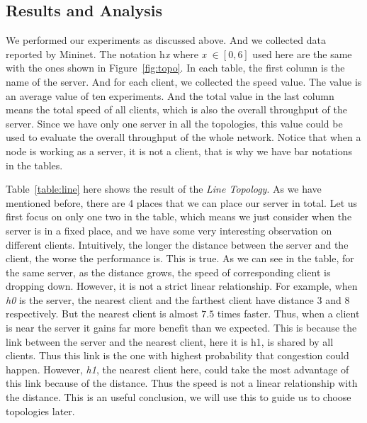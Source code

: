\subsection{Results and Analysis} \label{subsec:result}
We performed our experiments as discussed above. And we collected data reported by Mininet.
The notation h{\it x} where {\it x} $\in [0, 6]$ used here are the same with the ones 
shown in Figure~\ref{fig:topo}. In each table, the first column is the name of the server.
And for each client, we collected the speed value. The value is an average value of ten
experiments. And the total value in the last column means the total speed of all clients, 
which is also the overall throughput of the server. Since we have only one server in all the 
topologies, this value could be used to evaluate the overall throughput of the whole network. 
Notice that when a node is working as a server, it is not a client, that is why we have bar 
notations in the tables.

Table~\ref{table:line} here shows the result of the {\it Line Topology}. As we have 
mentioned before, there are 4 places that we can place our server in total. Let us first 
focus on only one two in the table, which means we just consider when the server is in a fixed
place, and we have some very interesting observation on different clients. Intuitively, 
the longer the distance between the server and the client, the worse the performance is. 
This is true. As we can see in the table, for the same server, as the distance grows, 
the speed of corresponding client is dropping down. However, it is not a strict linear 
relationship. For example, when {\it h0} is the server, the nearest client 
and the farthest client have distance $3$ and $8$ respectively. But the nearest client is 
almost $7.5$ times faster. Thus, when a client is near the server it gains far more benefit
than we expected. This is because the link between the server and the nearest client, here
it is h1, is shared by all clients. Thus this link is the one with highest probability that 
congestion could happen. However, {\it h1}, the nearest client here, could take the most advantage of
this link because of the distance. Thus the speed is not a linear relationship with the distance.
This is an useful conclusion, we will use this to guide us to choose topologies later.

